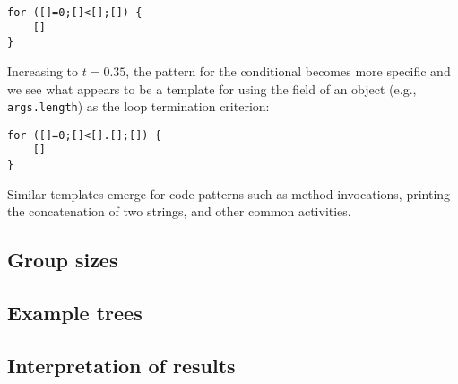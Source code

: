 \begin{verbatim}
for ([]=0;[]<[];[]) {
    []
}
\end{verbatim}

Increasing to $t=0.35$, the pattern for the conditional becomes more specific
and we see what appears to be a template for using the field of an object
(e.g., {\tt args.length}) as the loop termination criterion:

\begin{verbatim}
for ([]=0;[]<[].[];[]) {
    []
}
\end{verbatim}

Similar templates emerge for code patterns such as method invocations, printing
the concatenation of two strings, and other common activities.  

\subsection{Group sizes}

\subsection{Example trees}

\subsection{Interpretation of results}

